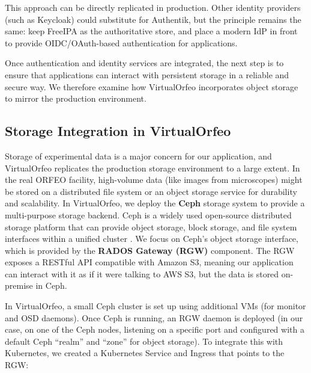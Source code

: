 This approach can be directly replicated in production. Other identity providers (such as Keycloak) could substitute for Authentik, but the principle remains the same: keep FreeIPA as the authoritative store, and place a modern IdP in front to provide OIDC/OAuth-based authentication for applications.

\medskip
\noindent Once authentication and identity services are integrated, 
the next step is to ensure that applications can interact 
with persistent storage in a reliable and secure way. 
We therefore examine how VirtualOrfeo incorporates object storage 
to mirror the production environment.


\subsection{Storage Integration in VirtualOrfeo} \label{sec:virtualorfeo-storage}

Storage of experimental data is a major concern for our application, and 
VirtualOrfeo replicates the production storage environment to a large extent. In 
the real ORFEO facility, high-volume data (like images from microscopes) might 
be stored on a distributed file system or an object storage service for 
durability and scalability. In VirtualOrfeo, we deploy the \textbf{Ceph} storage 
system to provide a multi-purpose storage backend. Ceph is a widely used 
open-source distributed storage platform that can provide object storage, block 
storage, and file system interfaces within a unified cluster 
\parencite{Weil2006Ceph}. We focus on Ceph’s object storage interface, which is 
provided by the \textbf{RADOS Gateway (RGW)} component. The RGW exposes a 
RESTful API compatible with Amazon S3, meaning our application can interact with 
it as if it were talking to AWS S3, but the data is stored on-premise in Ceph.

\medskip

In VirtualOrfeo, a small Ceph cluster is set up using additional VMs (for monitor 
and OSD daemons). Once Ceph is running, an RGW daemon is deployed (in our case, 
on one of the Ceph nodes, listening on a specific port and configured with a 
default Ceph ``realm'' and ``zone'' for object storage). To integrate this with 
Kubernetes, we created a Kubernetes Service and Ingress that points to the RGW:  

